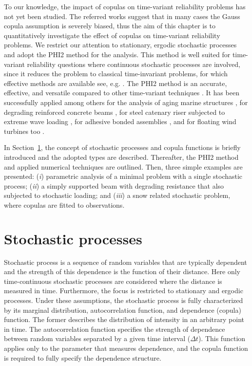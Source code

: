 To our knowledge, the impact of copulas on time-variant reliability problems has not yet been studied. The referred works suggest that in many cases the Gauss copula assumption is severely biased, thus the aim of this chapter is to quantitatively investigate the effect of copulas on time-variant reliability problems. We restrict our attention to stationary, ergodic stochastic processes and adopt the PHI2 method for the analysis.
This method is well suited for time-variant reliability questions where continuous stochastic processes are involved, since it reduces the problem to classical time-invariant problems, for which effective methods are available see, e.g. \citet{Ditlevsen2007}. The PHI2 method is an accurate, effective, and versatile compared to other time-variant techniques \citep{Renaud2002, Renaud2004, Baroth2011}. It has been successfully applied among others for the analysis of aging marine structures \citep{Mejri2011}, for degrading reinforced concrete beams \citep{Sudret2008rc}, for steel catenary riser subjected to extreme wave loading \citep{Perdrizet2008}, for adhesive bonded assemblies  \citep{Mejri2009}, and for floating wind turbines too \citep{Perdrizet2011}.

In Section~\ref{sec:stoch_proc}, the concept of stochastic processes and copula functions is briefly introduced and the adopted types are described. Thereafter, the PHI2 method and applied numerical techniques are outlined. Then, three simple examples are presented: (\textit{i}) parametric analysis of a minimal problem with a single stochastic process; (\textit{ii}) a simply supported beam with degrading resistance that also subjected to stochastic loading; and (\textit{iii}) a snow related stochastic problem, where copulas are fitted to observations.

\section{Stochastic processes}
\label{sec:stoch_proc}

Stochastic process is a sequence of random variables that are typically dependent and the strength of this dependence is the function of their distance. Here only time-continuous stochastic processes are considered where the distance is measured in time. Furthermore, the focus is restricted to stationary and ergodic processes. Under these assumptions, the stochastic process is fully characterized by its marginal distribution, autocorrelation function, and dependence (copula) function. The former describes the distribution of intensity in an arbitrary point in time. The autocorrelation function specifies the strength of dependence between random variables separated by a given time interval ($\Delta t$). This function applies only to the parameter that measures dependence, and the copula function is required to fully specify the dependence structure.

